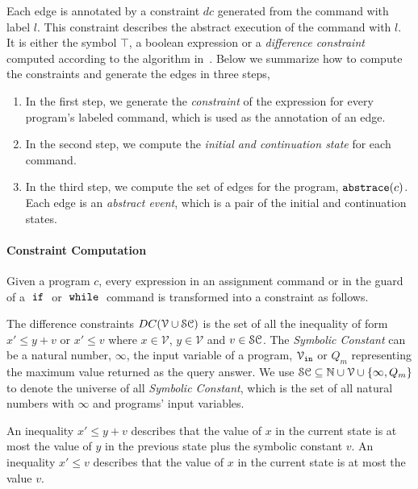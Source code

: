 Each edge is annotated by a constraint $dc$ generated from the command with label $l$.
This constraint describes the abstract execution of the command with $l$. 
It is either
the symbol $\top$, 
a boolean expression or 
a \emph{difference constraint} computed according to the algorithm in~\cite{SinnZV17}.
Below we summarize how to compute the constraints and generate the edges in three steps,
\begin{enumerate}
 \item In the first step, we generate the \emph{constraint}
 of the expression for every program's labeled command,
 which is used as the annotation of an edge.

 \item In the second step, we compute the \emph{initial and continuation state} for each command. 

 \item In the third step, we compute the set of edges for the program, $\mathtt{abs}{\mathtt{trace}}(c)$.
 Each edge is an \emph{abstract event}, which is a pair of the initial and continuation states.
\end{enumerate}
%
\paragraph{Constraint Computation}
Given a program $c$,
every expression in an assignment command or in the guard of a $\;\mathtt{if}\;$ or $\;\mathtt{while}\;$ command
is transformed into a constraint as follows.
%
%
\begin{defn}
The difference constraints $DC(\mathcal{V} \cup \mathcal{SC})$ is the set of all the inequality of
form $x' \leq y + v$ or $x' \leq v$ where $x \in \mathcal{V} $, 
$y \in \mathcal{V}$ and $v \in \mathcal{SC}$.
The \emph{Symbolic Constant} can be a natural number, $\infty$, the input variable of a program, $\mathcal{V}_{\mathtt{\mathtt{in}}}$ or
$Q_m$ representing the maximum value returned as the query answer. 
We use $\mathcal{SC} \subseteq \mathbb{N} \cup \mathcal{V} \cup \{ \infty, Q_m \}$ to denote the universe of all \emph{Symbolic Constant},
which is the set of all natural numbers with $\infty$ and programs' input variables.
\end{defn}
An inequality $x' \leq y + v$ describes that the value of $x$ in the current state is
at most the value of $y$ in the previous state plus the symbolic constant $v$.
An inequality $x' \leq v$ describes that the value of $x$ in the current state is
at most the value $v$.

